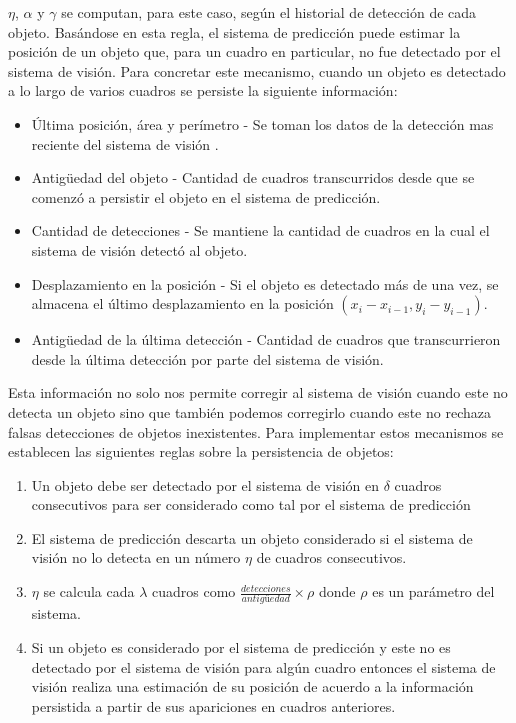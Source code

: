 $\eta$, $\alpha$ y $\gamma$ se computan, para este caso, según el 
historial de detección de cada objeto.  Basándose en esta regla, el 
sistema de predicción puede estimar la posición de un objeto que, 
para un cuadro en particular, no fue detectado por el sistema de 
visión. Para concretar este mecanismo, cuando un objeto es detectado a lo largo de varios cuadros se persiste la siguiente información:
\begin{itemize}
\item{ Última posición, área y perímetro - Se toman los datos de la detección mas reciente del sistema de visión .}
\item{ Antigüedad del objeto - Cantidad de cuadros transcurridos desde que se comenzó a persistir el objeto en el sistema de predicción.}
\item{ Cantidad de detecciones - Se mantiene la cantidad de cuadros en la cual el sistema de visión detectó al objeto.}
\item{ Desplazamiento en la posición - Si el objeto es detectado más 
de una vez, se almacena el último desplazamiento en la posición $(x_i - 
x_{i-1} , y_i - y_{i-1} )$.}
\item{ Antigüedad de la última detección - Cantidad de cuadros que transcurrieron desde la última detección por parte del sistema de visión.}  
\end{itemize}
Esta información no solo nos permite corregir al sistema de visión 
cuando este no detecta un objeto sino que también podemos corregirlo 
cuando este no rechaza falsas detecciones de objetos inexistentes. Para 
implementar estos mecanismos se establecen las siguientes reglas sobre 
la persistencia de objetos:
\begin{enumerate}
\item{Un objeto debe ser detectado por el sistema de visión en $\delta$ 
cuadros consecutivos para ser considerado como tal por el sistema de 
predicción}
\item{El sistema de predicción descarta un objeto considerado si el 
sistema de visión no lo detecta en un número $\eta$ de cuadros 
consecutivos.}
\item{ $\eta$ se calcula cada $\lambda$ cuadros como 
$\frac{detecciones}{antigüedad}\times \rho$ donde $\rho$ es un parámetro del 
sistema}.
\item{ Si un objeto es considerado por el sistema de predicción y este 
no es detectado por el sistema de visión para algún cuadro entonces 
el sistema de visión realiza una estimación de su posición de 
acuerdo a la información persistida a partir de sus apariciones en cuadros anteriores.}
\end{enumerate}

